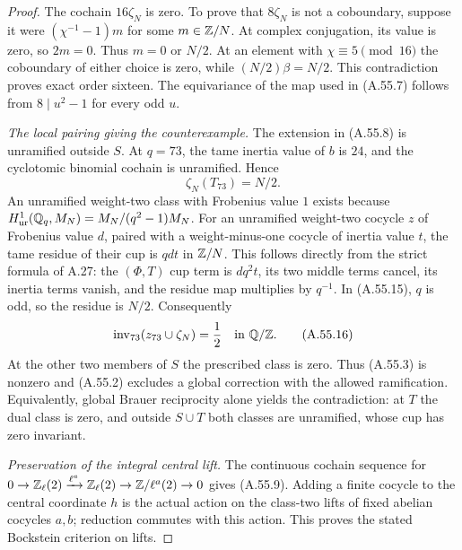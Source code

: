 \begin{proof}
The cochain $16\zeta_N$ is zero.  To prove that
$8\zeta_N$ is not a coboundary, suppose it were
$(\chi^{-1}-1)m$ for some $m\in\mathbb Z/N$.
At complex conjugation, its value is zero, so $2m=0$.
Thus $m=0$ or $N/2$.  At an element with
$\chi\equiv5\pmod {16}$ the coboundary of either choice
is zero, while $(N/2)\beta=N/2$.  This contradiction proves
exact order sixteen.  The equivariance of the map used in
(A.55.7) follows from $8\mid u^2-1$ for every odd $u$.

\emph{The local pairing giving the counterexample.}
The extension in (A.55.8) is unramified outside $S$.
At $q=73$, the tame inertia value of $b$ is $24$, and the
cyclotomic binomial cochain is unramified.  Hence
\[
                        \zeta_N(T_{73})=N/2.
 \tag{A.55.15}
\]
An unramified weight-two class with Frobenius value $1$
exists because
$H^1_{\rm ur}(\mathbb Q_q,M_N)=M_N/(q^2-1)M_N$.
For an unramified weight-two cocycle $z$ of Frobenius
value $d$, paired with a weight-minus-one cocycle of inertia
value $t$, the tame residue of their cup is $qdt$ in
$\mathbb Z/N$.  This follows directly from the strict formula
of A.27: the $(\Phi,T)$ cup term is $dq^2t$, its two
middle terms cancel, its inertia terms vanish, and the
residue map multiplies by $q^{-1}$.
In (A.55.15), $q$ is odd, so the residue is $N/2$.
Consequently
\[
              \operatorname{inv}_{73}(z_{73}\cup\zeta_N)
                                 =\frac12\quad\hbox{in }\mathbb Q/\mathbb Z.
 \tag{A.55.16}
\]
At the other two members of $S$ the prescribed class is zero.
Thus (A.55.3) is nonzero and (A.55.2) excludes a global
correction with the allowed ramification.  Equivalently,
global Brauer reciprocity alone yields the contradiction:
at $T$ the dual class is zero, and outside $S\cup T$ both
classes are unramified, whose cup has zero invariant.

\emph{Preservation of the integral central lift.}
The continuous cochain sequence for
$0\to\mathbb Z_\ell(2)\xrightarrow{\ell^a}\mathbb Z_\ell(2)
\to\mathbb Z/\ell^a(2)\to0$ gives (A.55.9).
Adding a finite cocycle to the central coordinate $h$ is
the actual action on the class-two lifts of fixed abelian
cocycles $a,b$; reduction commutes with this action.
This proves the stated Bockstein criterion on lifts.


\end{proof}
